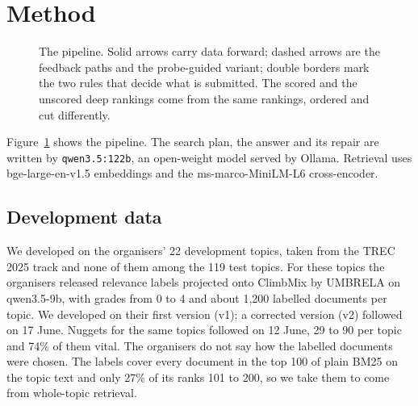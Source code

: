 \documentclass[sigconf,nonacm]{acmart}
\begin{document}
\section{Method}

\begin{figure}[t]
\centering

\caption{The pipeline. Solid arrows carry data forward; dashed arrows are the
feedback paths and the probe-guided variant; double borders mark the two rules that
decide what is submitted. The scored and the unscored deep rankings come from the
same rankings, ordered and cut differently.}
\label{fig:pipeline}
\end{figure}

Figure~\ref{fig:pipeline} shows the pipeline. The search plan, the answer and its
repair are written by \texttt{qwen3.5:122b}, an open-weight model served by Ollama.
Retrieval uses bge-large-en-v1.5 embeddings and the ms-marco-MiniLM-L6
cross-encoder.

\subsection{Development data}
We developed on the organisers' 22 development topics, taken from the TREC 2025
track and none of them among the 119 test topics. For these topics the organisers
released relevance labels projected onto ClimbMix by UMBRELA on qwen3.5-9b, with
grades from 0 to 4 and about 1,200 labelled documents per topic. We developed on
their first version (v1); a corrected version (v2) followed on 17 June. Nuggets for
the same topics followed on 12 June, 29 to 90 per topic and 74\% of them vital. The
organisers do not say how the labelled documents were chosen. The labels cover every
document in the top 100 of plain BM25 on the topic text and only 27\% of its ranks
101 to 200, so we take them to come from whole-topic retrieval.
\end{document}
